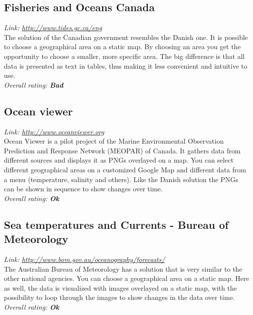 \documentclass[11pt,a4paper,titlepage,oneside]{report}
\begin{document}
  \subsection{Fisheries and Oceans Canada}
  \emph{Link: \url{http://www.tides.gc.ca/eng}} \\%
    The solution of the Canadian government resembles the Danish one. It is possible to choose a geographical area on a static map. By choosing an area you get the opportunity to choose a smaller, more specific area. The big difference is that all data is presented as text in tables, thus making it less convenient and intuitive to use.
  \\ \emph{Overall rating: \textbf{Bad}}

  \subsection{Ocean viewer}
  \emph{Link: \url{http://www.oceanviewer.org}} \\%
    Ocean Viewer is a pilot project of the Marine Environmental Observation Prediction and Response Network (MEOPAR) of Canada. It gathers data from different sources and displays it as PNGs overlayed on a map. You can select different geographical areas on a customized Google Map and different data from a menu (temperature, salinity and others). Like the Danish solution the PNGs can be shown in sequence to show changes over time.
  \\ \emph{Overall rating: \textbf{Ok}}

  \subsection{Sea temperatures and Currents - Bureau of Meteorology}
  \emph{Link: \url{http://www.bom.gov.au/oceanography/forecasts/}} \\%
    The Australian Bureau of Meteorology has a solution that is very similar to the other national agencies. You can choose a geographical area on a static map. Here as well, the data is visualized with images overlayed on a static map, with the possibility to loop through the images to show changes in the data over time.
  \\ \emph{Overall rating: \textbf{Ok}}
  
\end{document}
